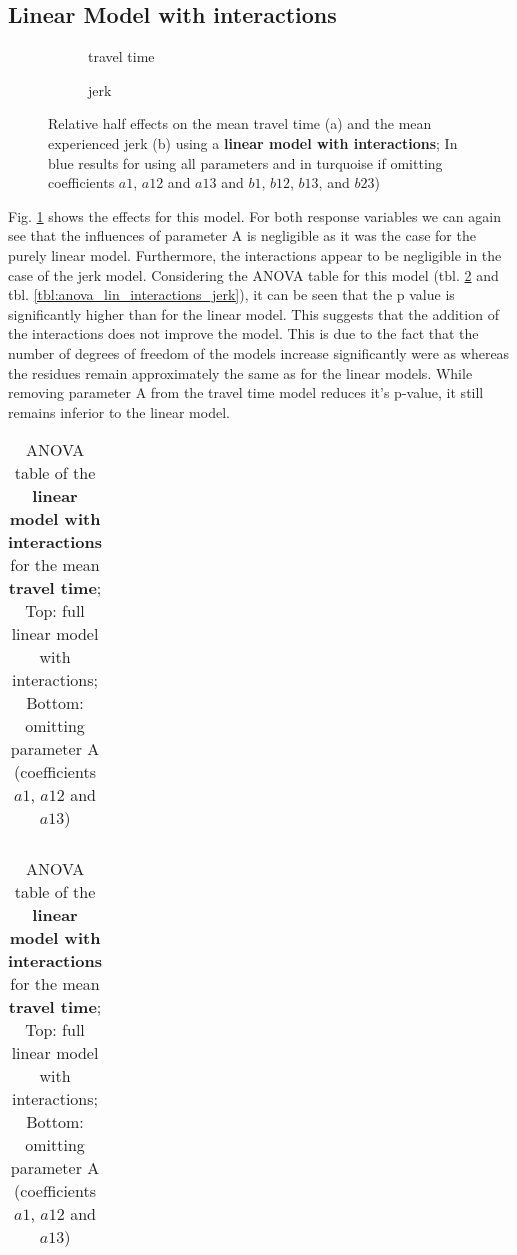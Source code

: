\subsection{Linear Model with interactions}

\begin{figure}[h]
    \centering
    \begin{subfigure}[b]{0.5\textwidth}
	    \setlength{\abovecaptionskip}{1pt plus 3pt minus 0pt}
	    
	    \caption{travel time}
	\end{subfigure}
    \begin{subfigure}[b]{0.5\textwidth}
		\setlength{\abovecaptionskip}{1pt plus 3pt minus 0pt}	
	    
   	    \caption{jerk}
	\end{subfigure}
	
    \caption{Relative half effects on the mean travel time (a) and the mean experienced jerk (b) using a \textbf{linear model with interactions}; In blue results for using all parameters and in turquoise if omitting coefficients $a1$, $a12$ and $a13$ and $b1$, $b12$, $b13$, and $b23$)}\label{fig:effects_lin_interactions}
\end{figure} 
Fig. \ref{fig:effects_lin_interactions} shows the effects for this model. For both response variables we can again see that the influences of parameter A is negligible as it was the case for the purely linear model. Furthermore, the interactions appear to be negligible in the case of the jerk model. Considering the ANOVA table for this model (tbl. \ref{tbl:anova_lin_interactions_time} and tbl. \ref{tbl:anova_lin_interactions_jerk}), it can be seen that the p value is significantly higher than for the linear model. This suggests that the addition of the interactions does not improve the model. This is due to the fact that the number of degrees of freedom of the models increase significantly were as whereas the residues remain approximately the same as for the linear models. While removing parameter A from the travel time model reduces it's p-value, it still remains inferior to the linear model.

\begin{table}[h!]
	\centering

	\begin{tabular}{l r r r r r}
	
	\end{tabular}

	\bigskip

	\begin{tabular}{l r r r r r}
		
	\end{tabular}

	\caption{ANOVA table of the \textbf{linear model with interactions} for the mean \textbf{travel time}; Top: full linear model with interactions; Bottom: omitting parameter A (coefficients $a1$, $a12$ and $a13$)}\label{tbl:anova_lin_interactions_time}
\end{table}

